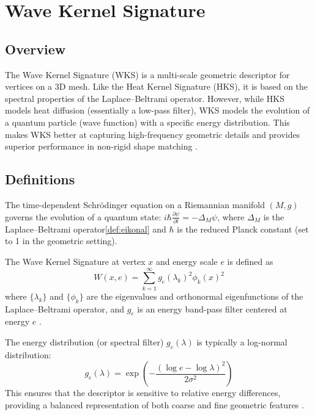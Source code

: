 \section{Wave Kernel Signature}
\label{sec:wave_kernel}

\subsection{Overview}
The Wave Kernel Signature (WKS) is a multi-scale geometric descriptor for vertices on a 3D mesh. Like the Heat Kernel Signature (HKS), it is based on the spectral properties of the Laplace--Beltrami operator. However, while HKS models heat diffusion (essentially a low-pass filter), WKS models the evolution of a quantum particle (wave function) with a specific energy distribution. This makes WKS better at capturing high-frequency geometric details and provides superior performance in non-rigid shape matching \cite{aubry2011}.

\subsection{Definitions}
\begin{definition}\label{def:schrodinger}
The time-dependent Schr\"{o}dinger equation on a Riemannian manifold $(M, g)$ governs the evolution of a quantum state: $i \hbar \frac{\partial \psi}{\partial t} = -\Delta_M \psi$, where $\Delta_M$ is the Laplace--Beltrami operator\cref{def:eikonal} and $\hbar$ is the reduced Planck constant (set to 1 in the geometric setting).
\end{definition}

\begin{definition}\label{def:wks}
The Wave Kernel Signature at vertex $x$ and energy scale $e$ is defined as
$$W(x, e) = \sum_{k=1}^\infty g_e(\lambda_k)^2 \phi_k(x)^2$$
where $\{\lambda_k\}$ and $\{\phi_k\}$ are the eigenvalues and orthonormal eigenfunctions of the Laplace--Beltrami operator, and $g_e$ is an energy band-pass filter centered at energy $e$ \cite{aubry2011}.
\end{definition}

\begin{definition}\label{def:energy_distribution}
The energy distribution (or spectral filter) $g_e(\lambda)$ is typically a log-normal distribution:
$$g_e(\lambda) = \exp\!\left(-\frac{(\log e - \log \lambda)^2}{2\sigma^2}\right)$$
This ensures that the descriptor is sensitive to relative energy differences, providing a balanced representation of both coarse and fine geometric features \cite{aubry2011,sun2009}.
\end{definition}

